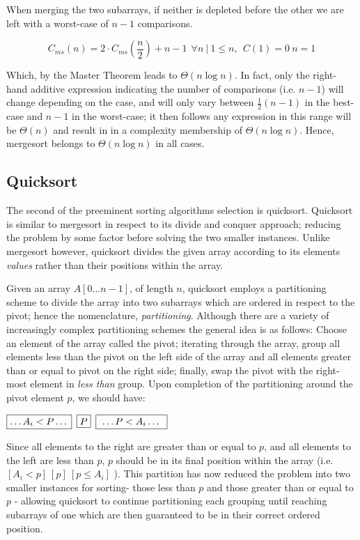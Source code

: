 \documentclass[11pt,letterpaper]{report}
\begin{document}
When merging the two subarrays, if neither is depleted before the other we are left with a worst-case of $n-1$ comparisons. 

\begin{equation} 
C_{ms}(n)=2 \cdot C_{ms}(\frac{n}{2})+n-1 \ \ \forall n~ | \ 1 \leq n, \ \ C(1) = 0 \ n=1
\end{equation}

Which, by the Master Theorem leads to $\Theta(n\log{}n)$. In fact, only the right-hand additive expression indicating the number of comparisons (i.e. $n-1$) will change depending on the case, and will only vary between $\frac{1}{2}(n-1)$ in the best-case and $n-1$ in the worst-case; it then follows any expression in this range will be $\Theta(n)$ and result in in a complexity membership of $\Theta(n\log{}n)$. Hence, mergesort belongs to $\Theta(n\log{}n)$ in all cases.


\subsection*{Quicksort}			%
The second of the preeminent sorting algorithms selection is quicksort. Quicksort is similar to mergesort in respect to its divide and conquer approach; reducing the problem by some factor before solving the two smaller instances. Unlike mergesort however, quicksort divides the given array according to its elements \emph{values} rather than their positions within the array.

Given an array $A[0...n-1]$, of length $n$, quicksort employs a partitioning scheme to divide the array into two subarrays which are ordered in respect to the pivot; hence the nomenclature, \emph{partitioning}. Although there are a variety of increasingly complex partitioning schemes the general idea is as follows:
Choose an element of the array called the pivot; iterating through the array, group all elements less than the pivot on the left side of the array and all elements greater than or equal to pivot on the right side; finally, swap the pivot with the right-most element in \emph{less than} group. Upon completion of the partitioning around the pivot element $p$, we should have:

\begin{center}
  \newcommand{\sep}{\hspace*{.5em}}
  $ \fbox{$\dots A_i  < P \dots$} \sep \fbox{$P$} \sep \fbox{  $ \dots P < A_i \dots$    } $
\end{center}

Since all elements to the right are greater than or equal to $p$, and all elements to the left are less than $p$, $p$ should be in its final position within the array (i.e. $[A_i < p]\ [p]\ [p \leq A_i ]$ ). This partition has now reduced the problem into two smaller instances for sorting- those less than $p$ and those greater than or equal to $p$ - allowing quicksort to continue partitioning each grouping until reaching subarrays of one which are then guaranteed to be in their correct ordered position.
\end{document}
